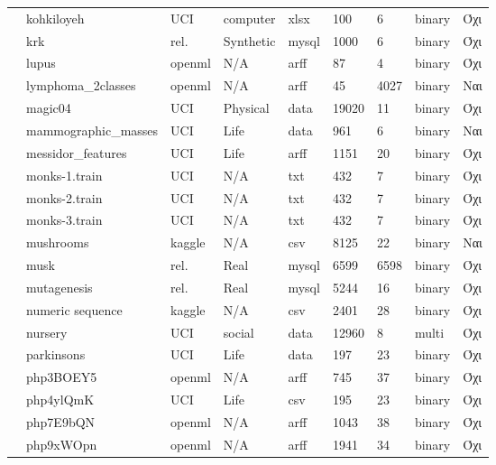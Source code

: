 {\begin{longtable}{|l| l| l | l | l | l |l | l | l | }
 							\rownumber & kohkiloyeh & UCI & computer& xlsx& 100 & 6 & binary & Όχι \\
 							\rownumber & krk \citep{krk} & rel. & Synthetic & mysql & 1000  & 6 & binary & Όχι \\
 							\rownumber & lupus \citep{lupus} & openml & N/A & arff & 87 & 4 & binary & Όχι \\
 							\rownumber & lymphoma\_2classes & openml & N/A & arff & 45 &4027 & binary& Nαι\\
 			\rownumber & magic04 & UCI & Physical & data & 19020 & 11 & binary & Όχι \\
 			\rownumber & mammographic\_masses & UCI & Life & data & 961 & 6 & binary & Ναι \\
 			\rownumber & messidor\_features\citep{messidor} & UCI & Life & arff &1151 &20 &binary &Όχι \\
 			\rownumber & monks-1.train \citep{monks} & UCI & N/A & txt & 432 & 7 & binary & Όχι \\
 			\rownumber & monks-2.train \citep{monks} & UCI & N/A & txt & 432 & 7 & binary & Όχι \\
 			\rownumber & monks-3.train \citep{monks}& UCI & N/A & txt & 432 & 7 & binary & Όχι \\
 			\rownumber & mushrooms \citep{mushroom} & kaggle & N/A & csv & 8125 & 22 & binary & Ναι \\
 			\rownumber & musk \citep{musk} & rel. & Real & mysql & 6599
 			  & 6598 & binary & Όχι \\
 			\rownumber & mutagenesis \citep{Mutagenesis} & rel. & Real & mysql & 5244 & 16 & binary & Όχι \\
 			\rownumber & numeric sequence \citep{sequence} & kaggle & N/A & csv & 2401 & 28 & binary & Όχι \\
 			\rownumber & nursery \citep{nursery} & UCI & social & data & 12960 & 8 & multi & Όχι \\
 			\rownumber & parkinsons \citep{parkinsons} & UCI & Life & data & 197 & 23 & binary & Όχι \\
 			\rownumber & php3BOEY5 \citep{pie} & openml & N/A & arff & 745  & 37  &  binary& Όχι \\
 			\rownumber & php4ylQmK \citep{thyroid} & UCI & Life & csv & 195 & 23 & binary & Όχι \\
 			\rownumber & php7E9bQN & openml & N/A & arff & 1043&38 & binary&Όχι \\
 			\rownumber & php9xWOpn & openml & N/A & arff &1941 &34 &binary  & Όχι \\

\end{longtable}}
